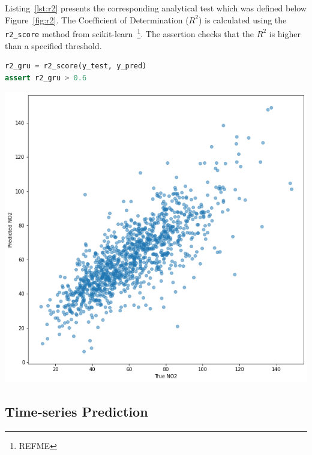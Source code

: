 \documentclass[acmsmall,screen,review,anonymous]{acmart}
\begin{document}
Listing~\ref{lst:r2} presents the corresponding analytical test which was defined below Figure~\ref{fig:r2}. The Coefficient of Determination ($R^2$) is calculated using the \texttt{r2\_score} method from scikit-learn~\footnote{REFME}. The assertion checks that the $R^2$ is higher than a specified threshold.


\begin{minipage}{0.5\textwidth}
  \begin{lstlisting}[language=Python]
r2_gru = r2_score(y_test, y_pred)
assert r2_gru > 0.6
  \end{lstlisting}
  \label{lst:r2}
\end{minipage}
\begin{minipage}{0.5\textwidth}
  \includegraphics[width=\linewidth]{../catalogue/select-332a.png}
  \label{fig:r2}
\end{minipage}

\subsection{Time-series Prediction}
\end{document}
